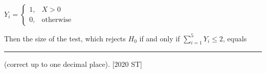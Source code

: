 \documentclass[journal]{IEEEtran}
\begin{document}
\begin{enumerate}
\begin{center}
     $Y_i = 
     \begin{cases}
         1, & X > 0  \\
         0, & \text{otherwise}
     \end{cases}$
    \end{center}
    Then the size of the test, which rejects $H_0$ if and only if $\sum_{i = 1}^5 Y_i \leq 2$, equals \rule{2cm}{0.4pt} (correct up to one decimal place). \hfill[2020 ST]
\end{enumerate}
\end{document}
